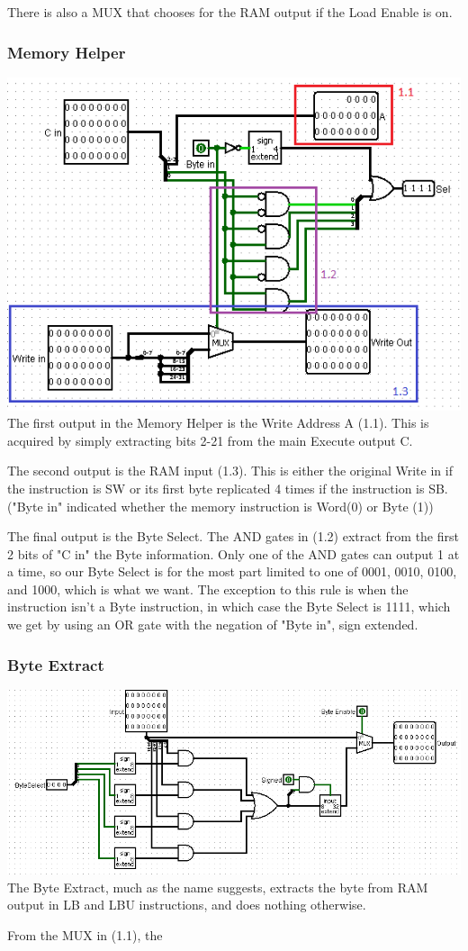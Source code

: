 \documentclass{article}
\begin{document}
 There is also a MUX that chooses for the RAM output if the Load Enable is on.
 
\subsubsection{Memory Helper}
\includegraphics{MemHelp.png}
The first output in the Memory Helper is the Write Address A (1.1). This is acquired by simply extracting bits 2-21 from the main Execute output C. 

The second output is the RAM input (1.3). This is either the original Write in if the instruction is SW or its first byte replicated 4 times if the instruction is SB. ("Byte in" indicated whether the memory instruction is Word(0) or Byte (1)) 

The final output is the Byte Select. The AND gates in (1.2) extract from the first 2 bits of "C in" the Byte information. Only one of the AND gates can output 1 at a time, so our Byte Select is for the most part limited to one of 0001, 0010, 0100, and 1000, which is what we want. The exception to this rule is when the instruction isn't a Byte instruction, in which case the Byte Select is 1111, which we get by using an OR gate with the negation of "Byte in", sign extended. 

\subsubsection{Byte Extract}
\includegraphics{ByteExtract.png} 
 The Byte Extract, much as the name suggests, extracts the byte from RAM output in LB and LBU instructions, and does nothing otherwise.
 
 From the MUX in (1.1), the 
\end{document}
